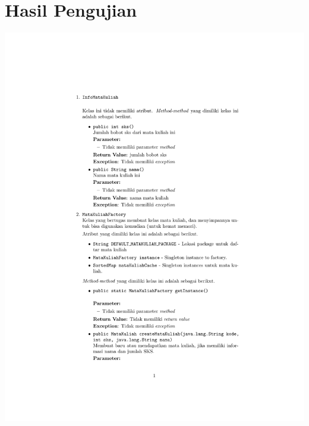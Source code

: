 \chapter{Hasil Pengujian}
\label{lamp:B}


%
%


\thispagestyle{empty}

{
  \centering
  \includegraphics[page=44, scale=1]{./Lampiran/siamodels.pdf}
}
\restoregeometry

